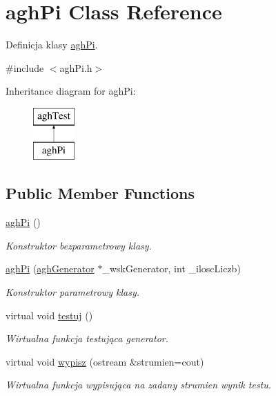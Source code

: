 \hypertarget{classaghPi}{\section{agh\-Pi \-Class \-Reference}
\label{classaghPi}
}


\-Definicja klasy \hyperlink{classaghPi}{agh\-Pi}.  




{\ttfamily \#include $<$agh\-Pi.\-h$>$}

\-Inheritance diagram for agh\-Pi\-:\begin{figure}[H]
\begin{center}
\leavevmode
\includegraphics[height=2.000000cm]{classaghPi}
\end{center}
\end{figure}
\subsection*{\-Public \-Member \-Functions}
\begin{DoxyCompactItemize}
\item 
\hypertarget{classaghPi_aa71f972681e797f5c0ceaa03108a5405}{\hyperlink{classaghPi_aa71f972681e797f5c0ceaa03108a5405}{agh\-Pi} ()}\label{classaghPi_aa71f972681e797f5c0ceaa03108a5405}

\begin{DoxyCompactList}\small\item\em \-Konstruktor bezparametrowy klasy. \end{DoxyCompactList}\item 
\hyperlink{classaghPi_aa01f39d1292324113611a0d027b50844}{agh\-Pi} (\hyperlink{classaghGenerator}{agh\-Generator} $\ast$\-\_\-wsk\-Generator, int \-\_\-ilosc\-Liczb)
\begin{DoxyCompactList}\small\item\em \-Konstruktor parametrowy klasy. \end{DoxyCompactList}\item 
\hypertarget{classaghPi_a5c24506f0ba7143dc8423a747182f944}{virtual void \hyperlink{classaghPi_a5c24506f0ba7143dc8423a747182f944}{testuj} ()}\label{classaghPi_a5c24506f0ba7143dc8423a747182f944}

\begin{DoxyCompactList}\small\item\em \-Wirtualna funkcja testująca generator. \end{DoxyCompactList}\item 
virtual void \hyperlink{classaghPi_ab3647aaa2e951924447d755379d043b4}{wypisz} (ostream \&strumien=cout)
\begin{DoxyCompactList}\small\item\em \-Wirtualna funkcja wypisująca na zadany strumien wynik testu. \end{DoxyCompactList}\end{DoxyCompactItemize}
